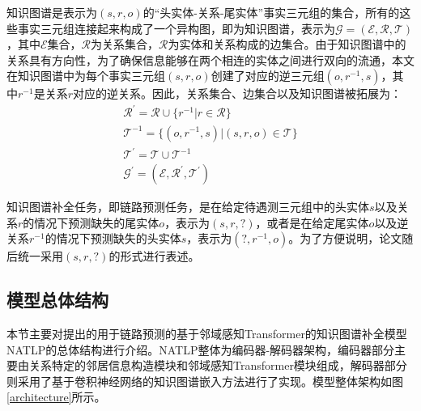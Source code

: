 \begin{longtable}[htbp]{cc}
\end{longtable}

知识图谱是表示为$(s,r,o)$的“头实体-关系-尾实体”事实三元组的集合，所有的这些事实三元组连接起来构成了一个异构图，即为知识图谱，表示为$\mathcal{G} = (\mathcal{E}, \mathcal{R}, \mathcal{T})$，其中$\mathcal{E}$集合，$\mathcal{R}$为关系集合，$\mathcal{R}$为实体和关系构成的边集合。由于知识图谱中的关系具有方向性，为了确保信息能够在两个相连的实体之间进行双向的流通，本文在知识图谱中为每个事实三元组$(s,r,o)$创建了对应的逆三元组$(o,r^{-1},s)$，其中$r^{-1}$是关系$r$对应的逆关系。因此，关系集合、边集合以及知识图谱被拓展为：
\begin{gather}
    \mathcal{R}^{\prime}=\mathcal{R}\cup\{ r^{-1} | r\in \mathcal{R}\}\\
    \mathcal{T}^{-1}= \{ (o,r^{-1},s)| (s,r,o)\in \mathcal{T}\}\\
    \mathcal{T}^{\prime} = \mathcal{T}\cup\mathcal{T}^{-1}\\
    \mathcal{G}^\prime = (\mathcal{E}, \mathcal{R}^\prime, \mathcal{T}^\prime)
\end{gather}

知识图谱补全任务，即链路预测任务，是在给定待遇测三元组中的头实体$s$以及关系$r$的情况下预测缺失的尾实体$o$，表示为$(s, r, ?)$，或者是在给定尾实体$o$以及逆关系$r^{-1}$的情况下预测缺失的头实体$s$，表示为$(?, r^{-1} , o) $。为了方便说明，论文随后统一采用$(s, r, ?)$的形式进行表述。


\subsection{模型总体结构}

本节主要对提出的用于链路预测的基于邻域感知Transformer的知识图谱补全模型NATLP的总体结构进行介绍。NATLP整体为编码器-解码器架构，编码器部分主要由关系特定的邻居信息构造模块和邻域感知Transformer模块组成，解码器部分则采用了基于卷积神经网络的知识图谱嵌入方法进行了实现。模型整体架构如图\ref{architecture}所示。

